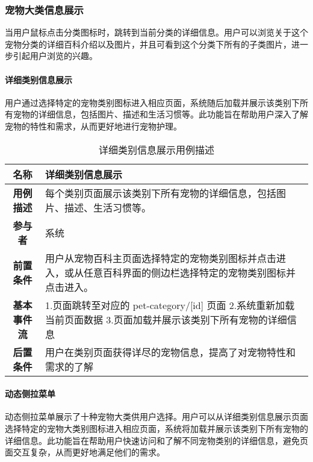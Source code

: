 \subsubsection{宠物大类信息展示}

当用户鼠标点击分类图标时，跳转到当前分类的详细信息。用户可以浏览关于这个宠物分类的详细百科介绍以及图片，并且可看到这个分类下所有的子类图片，进一步引起用户浏览的兴趣。

\paragraph{详细类别信息展示}

用户通过选择特定的宠物类别图标进入相应页面，系统随后加载并展示该类别下所有宠物的详细信息，包括图片、描述和生活习惯等。此功能旨在帮助用户深入了解宠物的特性和需求，从而更好地进行宠物护理。

\begin{table}[H]
	\centering
	\caption{详细类别信息展示用例描述}
	\renewcommand\arraystretch{1.5}
	\begin{tabular}{|c|>{\raggedright\arraybackslash}p{10cm}|}
		\hline
		\textbf{名称} & \textbf{详细类别信息展示} \\ \hline
		\textbf{用例描述} & 每个类别页面展示该类别下所有宠物的详细信息，包括图片、描述、生活习惯等。 \\ \hline
		\textbf{参与者} & 系统 \\ \hline
		\textbf{前置条件} & 用户从宠物百科主页面选择特定的宠物类别图标并点击进入，或从任意百科界面的侧边栏选择特定的宠物类别图标并点击进入。 \\ \hline
		\textbf{基本事件流} &
		1.页面跳转至对应的 pet-category/[id] 页面\newline
		2.系统重新加载当前页面数据\newline
		3.页面加载并展示该类别下所有宠物的详细信息\\
		\hline
		\textbf{后置条件} & 用户在类别页面获得详尽的宠物信息，提高了对宠物特性和需求的了解 \\ \hline
	\end{tabular}
\end{table}

\paragraph{动态侧拉菜单}

动态侧拉菜单展示了十种宠物大类供用户选择。用户可以从详细类别信息展示页面选择特定的宠物大类别图标进入相应页面，系统将加载并展示该类别下所有宠物的详细信息。此功能旨在帮助用户快速访问和了解不同宠物类别的详细信息，避免页面交互复杂，从而更好地满足他们的需求。

